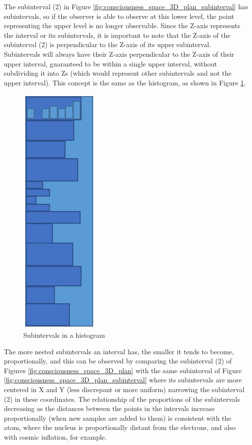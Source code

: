 
The subinterval (2) in Figure \ref{fig:consciousness_space_3D_plan_subinterval} has subintervals, so if the observer is able to observe at this lower level, the point representing the upper level is no longer observable. Since the Z-axis represents the interval or its subintervals, it is important to note that the Z-axis of the subinterval (2) is perpendicular to the Z-axis of its upper subinterval. Subintervals will always have their Z-axis perpendicular to the Z-axis of their upper interval, guaranteed to be within a single upper interval, without subdividing it into Zs (which would represent other subintervals and not the upper interval). This concept is the same as the histogram, as shown in Figure \ref{fig:consciousness_space_3D_plan_histogram}.
	\begin{figure}[H]
	\caption{Subintervals in a histogram}
	\label{fig:consciousness_space_3D_plan_histogram}
	\centering
	\includegraphics[scale=.6]{sections/images/consciousness_space_3D_plan_histogram.jpg}
	\end{figure}

The more nested subintervals an interval has, the smaller it tends to become, proportionally, and this can be observed by comparing the subinterval (2) of Figures \ref{fig:consciousness_space_3D_plan} with the same subinterval of Figure \ref{fig:consciousness_space_3D_plan_subinterval} where its subintervals are more centered in X and Y (less discrepant or more uniform) narrowing the subinterval (2) in these coordinates. The relationship of the proportions of the subintervals decreasing as the distances between the points in the intervals increase proportionally (when new samples are added to them) is consistent with the atom, where the nucleus is proportionally distant from the electrons, and also with cosmic inflation, for example.

